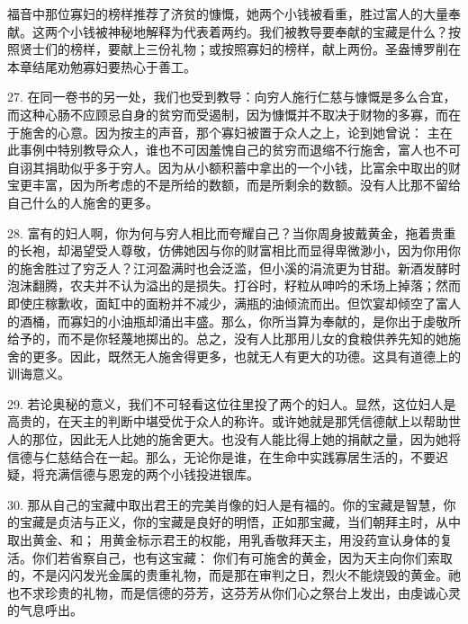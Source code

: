 福音中那位寡妇的榜样推荐了济贫的慷慨，她两个小钱被看重，胜过富人的大量奉献。这两个小钱被神秘地解释为代表着两约。我们被教导要奉献的宝藏是什么？按照贤士们的榜样，要献上三份礼物；或按照寡妇的榜样，献上两份。圣盎博罗削在本章结尾劝勉寡妇要热心于善工。\par

27. 在同一卷书的另一处，我们也受到教导：向穷人施行仁慈与慷慨是多么合宜，而这种心肠不应顾忌自身的贫穷而受遏制，因为慷慨并不取决于财物的多寡，而在于施舍的心意。因为按主的声音，那个寡妇被置于众人之上，论到她曾说： 主在此事例中特别教导众人，谁也不可因羞愧自己的贫穷而退缩不行施舍，富人也不可自诩其捐助似乎多于穷人。因为从小额积蓄中拿出的一个小钱，比富余中取出的财宝更丰富，因为所考虑的不是所给的数额，而是所剩余的数额。没有人比那不留给自己什么的人施舍的更多。\par

28. 富有的妇人啊，你为何与穷人相比而夸耀自己？当你周身披戴黄金，拖着贵重的长袍，却渴望受人尊敬，仿佛她因与你的财富相比而显得卑微渺小，因为你用你的施舍胜过了穷乏人？江河盈满时也会泛滥，但小溪的涓流更为甘甜。新酒发酵时泡沫翻腾，农夫并不认为溢出的是损失。打谷时，籽粒从呻吟的禾场上掉落；然而即使庄稼歉收，面缸中的面粉并不减少，满瓶的油倾流而出。但饮宴却倾空了富人的酒桶，而寡妇的小油瓶却涌出丰盛。那么，你所当算为奉献的，是你出于虔敬所给予的，而不是你轻蔑地掷出的。总之，没有人比那用儿女的食粮供养先知的她施舍的更多。因此，既然无人施舍得更多，也就无人有更大的功德。这具有道德上的训诲意义。\par

29. 若论奥秘的意义，我们不可轻看这位往里投了两个的妇人。显然，这位妇人是高贵的，在天主的判断中堪受优于众人的称许。或许她就是那凭信德献上以帮助世人的那位，因此无人比她的施舍更大。也没有人能比得上她的捐献之量，因为她将信德与仁慈结合在一起。那么，无论你是谁，在生命中实践寡居生活的，不要迟疑，将充满信德与恩宠的两个小钱投进银库。\par

30. 那从自己的宝藏中取出君王的完美肖像的妇人是有福的。你的宝藏是智慧，你的宝藏是贞洁与正义，你的宝藏是良好的明悟，正如那宝藏，当们朝拜主时，从中取出黄金、和； 用黄金标示君王的权能，用乳香敬拜天主，用没药宣认身体的复活。你们若省察自己，也有这宝藏： 你们有可施舍的黄金，因为天主向你们索取的，不是闪闪发光金属的贵重礼物，而是那在审判之日，烈火不能烧毁的黄金。祂也不求珍贵的礼物，而是信德的芬芳，这芬芳从你们心之祭台上发出，由虔诚心灵的气息呼出。\par

